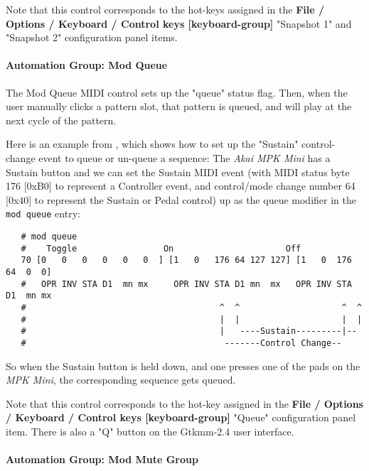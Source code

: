    Note that this control corresponds to the hot-keys assigned in
   the \textbf{File / Options / Keyboard / Control keys [keyboard-group]} 
   "Snapshot 1" and "Snapshot 2" configuration panel items.

\paragraph{Automation Group: Mod Queue}
\label{paragraph:seq64_rc_file_midi_ctrl_modqueue}

   The Mod Queue MIDI control sets up the "queue" status flag.
   Then, when the user manually clicks a pattern slot,
   that pattern is queued, and will play at the next cycle of the
   pattern.

   Here is an example from \cite{midicontrol}, which shows how to set up
   the "Sustain" control-change event to queue or un-queue a sequence:
   The \textsl{Akai MPK Mini} has a Sustain button and we can set the
   Sustain MIDI event (with MIDI status byte 176 [0xB0] to represent a
   Controller event, and control/mode change number 64 [0x40] to
   represent the Sustain or Pedal control) up as the queue modifier in
   the \texttt{mod queue} entry:

   \begin{verbatim}
   # mod queue
   #    Toggle                 On                      Off
   70 [0   0   0   0   0   0  ] [1   0   176 64 127 127] [1   0  176 64  0  0]
   #   OPR INV STA D1  mn mx     OPR INV STA D1 mn  mx   OPR INV STA D1  mn mx
   #                                      ^  ^                    ^  ^
   #                                      |  |                    |  |
   #                                      |   ----Sustain---------|--
   #                                       -------Control Change--
   \end{verbatim}

   So when the Sustain button is held down, and one presses one of the pads
   on the \textsl{MPK Mini}, the corresponding sequence gets queued.

   Note that this control corresponds to the hot-key assigned in
   the \textbf{File / Options / Keyboard / Control keys [keyboard-group]} 
   "Queue" configuration panel item.  There is also a "Q" button on the
   Gtkmm-2.4 user interface.

\paragraph{Automation Group: Mod Mute Group}
\label{paragraph:seq64_rc_file_midi_ctrl_modgmute}


